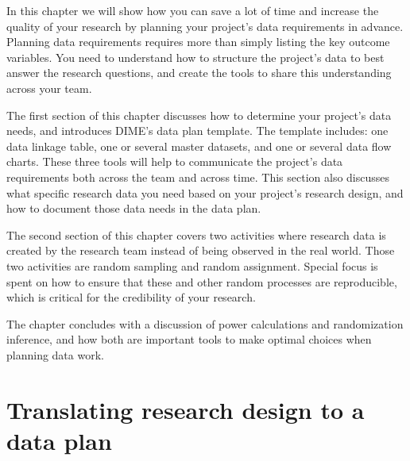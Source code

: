
\begin{fullwidth}

In this chapter we will show how you can save a lot of time
and increase the quality of your research by 
planning your project's data requirements in advance.
Planning data requirements requires more than
simply listing the key outcome variables. 
You need to understand how to structure the project's data
to best answer the research questions, 
and create the tools to share this understanding across your team.

The first section of this chapter discusses how to 
determine your project's data needs, 
and introduces DIME's data plan template. 
The template includes: 
one data linkage table,
one or several master datasets, and
one or several data flow charts. 
These three tools will help to communicate the project's data requirements
both across the team and across time.
This section also discusses what specific research data you need 
based on your project's research design,
and how to document those data needs in the data plan.

The second section of this chapter covers two activities where 
research data is created by the research team 
instead of being observed in the real world.
Those two activities are random sampling and random assignment.
Special focus is spent on how to ensure that 
these and other random processes are reproducible,
which is critical for the credibility of your research.

The chapter concludes with a discussion of power calculations and randomization inference,
and how both are important tools to make optimal choices when planning data work.


\end{fullwidth}


\section{Translating research design to a data plan}

